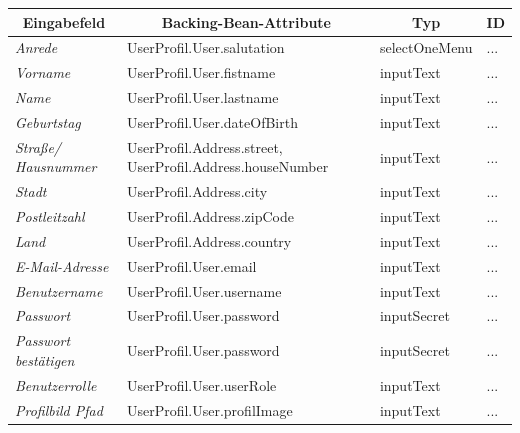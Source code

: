 \begin{itemize}
				\begin{center}
					\begin{longtable}{|p{3cm} |p{5cm} | p{4cm}|p{3cm}|}
						
						\hline \multicolumn{1}{|c|}{\textbf{Eingabefeld}} & \multicolumn{1}{|c|}{\textbf{Backing-Bean-Attribute}} & \multicolumn{1}{|c|}{\textbf{Typ}}  &  \multicolumn{1}{|c|}{\textbf{ID}} \\ \hline
						\endfirsthead
						\hline
						\endlastfoot
						\textit{Anrede} & UserProfil.User.salutation & selectOneMenu & ... \\ \hline
						\textit{Vorname} & UserProfil.User.fistname & inputText & ... \\ \hline
						\textit{Name} & UserProfil.User.lastname & inputText & ... \\ \hline
						\textit{Geburtstag } & UserProfil.User.dateOfBirth & inputText & ... \\ \hline
						\textit{Straße/ Hausnummer} & UserProfil.Address.street, UserProfil.Address.houseNumber  & inputText & ...\\ \hline
						\textit{Stadt} & UserProfil.Address.city & inputText & ... \\ \hline
						\textit{Postleitzahl} & UserProfil.Address.zipCode & inputText & ... \\ \hline
						\textit{Land} & UserProfil.Address.country & inputText & ... \\ \hline
						\textit{E-Mail-Adresse} & UserProfil.User.email & inputText & ...\\ \hline
						\textit{Benutzername} & UserProfil.User.username & inputText & ... \\ \hline
						\textit{Passwort} & UserProfil.User.password  & inputSecret & ... \\ \hline
						\textit{Passwort bestätigen} & UserProfil.User.password & inputSecret & ... \\ \hline
						\textit{Benutzerrolle} & UserProfil.User.userRole & inputText & ... \\ \hline
						\textit{Profilbild Pfad} & UserProfil.User.profilImage & inputText & ... \\ \hline
					\end{longtable}
				\end{center}
				
				\begin{center}
					\begin{longtable}{|p{3cm} |p{8cm} | p{5cm}|}
						

\end{longtable}
\end{center}
\end{itemize}

